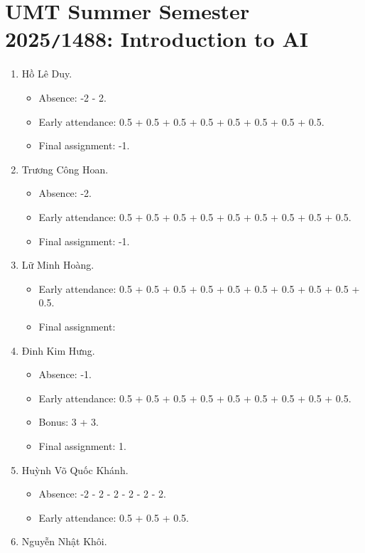 \documentclass{article}
\begin{document}

\section{UMT Summer Semester 2025{\tt/}1488: Introduction to AI}

\begin{enumerate}
	\item {\sc Hồ Lê Duy.}
	\begin{itemize}
		\item Absence: -2 - 2.
		\item Early attendance: 0.5 + 0.5 + 0.5 + 0.5 + 0.5 + 0.5 + 0.5 + 0.5.
        \item Final assignment: -1.
	\end{itemize}
	\item {\sc Trương Công Hoan.}
	\begin{itemize}
		\item Absence: -2.
		\item Early attendance: 0.5 + 0.5 + 0.5 + 0.5 + 0.5 + 0.5 + 0.5 + 0.5 + 0.5.
        \item Final assignment: -1.
	\end{itemize}
	\item {\sc Lữ Minh Hoàng.}
	\begin{itemize}
		\item Early attendance: 0.5 + 0.5 + 0.5 + 0.5 + 0.5 + 0.5 + 0.5 + 0.5 + 0.5 + 0.5.
        \item Final assignment:
	\end{itemize}
	\item {\sc Đinh Kim Hưng.}
	\begin{itemize}
        \item Absence: -1.
		\item Early attendance: 0.5 + 0.5 + 0.5 + 0.5 + 0.5 + 0.5 + 0.5 + 0.5 + 0.5.
		\item Bonus: 3 + 3.
        \item Final assignment: 1.
	\end{itemize}
	\item {\sc Huỳnh Võ Quốc Khánh.}
	\begin{itemize}
		\item Absence: -2 - 2 - 2 - 2 - 2 - 2.
		\item Early attendance: 0.5 + 0.5 + 0.5.
	\end{itemize}
	\item {\sc Nguyễn Nhật Khôi.}

\end{enumerate}
\end{document}
